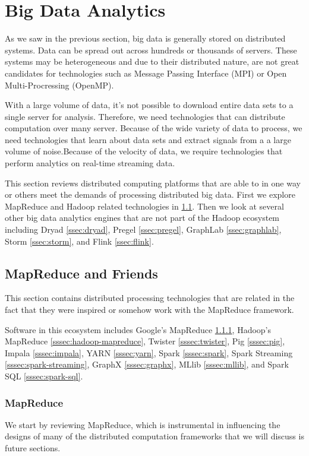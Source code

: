 \documentclass[]{article}
\begin{document}
\section{Big Data Analytics} \label{sec:big-data-analytics}
As we saw in the previous section, big data is generally stored on distributed systems. Data can be spread out across hundreds or thousands of servers. These systems may be heterogeneous and due to their distributed nature, are not great candidates for technologies such as Message Passing Interface (MPI) or Open Multi-Procressing (OpenMP)\cite{chen_big_2014}. 

With a large volume of data, it's not possible to download  entire data sets to a single server for analysis. Therefore, we need technologies that can distribute computation over many server. Because of the wide variety of data to process, we need technologies that learn about data sets and extract signals from a a large volume of noise.Because of the velocity of data, we require technologies that perform analytics on real-time streaming data.

This section reviews distributed computing platforms that are able to in one way or others meet the demands of processing distributed big data. First we explore MapReduce and Hadoop related technologies in \ref{ssec:mapreduce-and-friends}. Then we look at several other big data analytics engines that are not part of the Hadoop ecosystem including Dryad \ref{ssec:dryad}, Pregel \ref{ssec:pregel}, GraphLab \ref{ssec:graphlab}, Storm \ref{ssec:storm}, and Flink \ref{ssec:flink}.

\subsection{MapReduce and Friends}\label{ssec:mapreduce-and-friends}
This section contains distributed processing technologies that are related in the fact that they were inspired or somehow work with the MapReduce framework.

Software in this ecosystem includes Google's MapReduce \ref{sssec:mapreduce}, Hadoop's MapReduce \ref{sssec:hadoop-mapreduce}, Twister \ref{sssec:twister}, Pig \ref{sssec:pig}, Impala \ref{sssec:impala}, YARN \ref{sssec:yarn}, Spark \ref{sssec:spark}, Spark Streaming \ref{sssec:spark-streaming}, GraphX \ref{sssec:graphx}, MLlib \ref{sssec:mllib}, and Spark SQL \ref{sssec:spark-sql}.

\subsubsection{MapReduce}\label{sssec:mapreduce}
We start by reviewing MapReduce, which is instrumental in influencing the designs of many of the distributed computation frameworks that we will discuss is future sections. 
\end{document}
